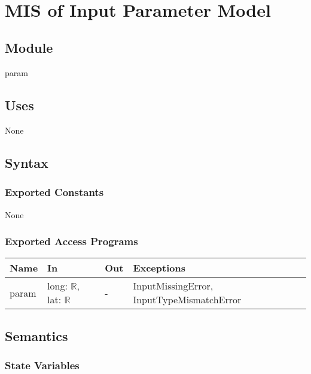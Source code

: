 \documentclass[12pt, titlepage]{article}
\begin{document}
~\newpage

\section{MIS of Input Parameter Model} \label{inputParameterModule} 



\subsection{Module}
param
\subsection{Uses}
None

\subsection{Syntax}

\subsubsection{Exported Constants}
None

\subsubsection{Exported Access Programs}

\begin{center}
\begin{tabular}{p{2cm} p{5cm} p{2cm} p{5cm}}
\hline
\textbf{Name} & \textbf{In} & \textbf{Out} & \textbf{Exceptions} \\
\hline
param & long: $\mathbb{R}$, lat: $\mathbb{R}$ & - & InputMissingError, InputTypeMismatchError \\
\hline
\end{tabular}
\end{center}

\subsection{Semantics}

\subsubsection{State Variables}
\end{document}
